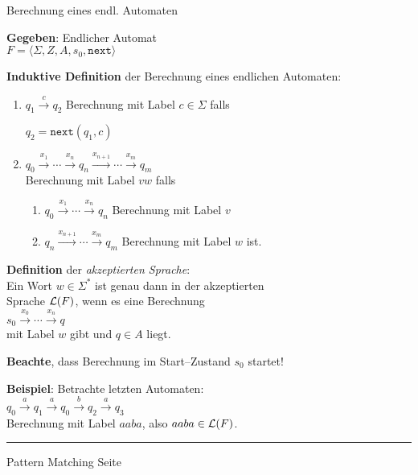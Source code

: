 \begin{slide}{}
\normalsize

\begin{center}
  Berechnung eines endl. Automaten
\end{center}
\vspace*{0.5cm}

\footnotesize
\textbf{Gegeben}: Endlicher Automat \\[0.3cm]
\hspace*{1.3cm} $F = \langle \Sigma, Z, A, s_0, \mathtt{next}  \rangle$ 

\textbf{Induktive Definition} der Berechnung eines endlichen Automaten:
\begin{enumerate}
\item $q_1 \stackrel{c}{\rightarrow} q_2$ \quad Berechnung mit Label $c\in \Sigma$ falls 

      $q_2 = \mathtt{next}(q_1, c)$
\item $q_0 \stackrel{x_1}{\rightarrow} \cdots \stackrel{x_n}{\rightarrow} q_n \stackrel{x_{n+1}}{\rightarrow} \cdots \stackrel{x_m}{\rightarrow} q_{m}$ \\[0.3cm]
      Berechnung mit Label $vw$ falls 
      \begin{enumerate}
      \item $q_0 \stackrel{x_1}{\rightarrow} \cdots \stackrel{x_n}{\rightarrow} q_n$ Berechnung mit Label $v$
      \item $q_n \stackrel{x_{n+1}}{\rightarrow} \cdots \stackrel{x_m}{\rightarrow} q_{m}$  Berechnung mit Label $w$ ist.
      \end{enumerate}
\end{enumerate}

\textbf{Definition} der \emph{akzeptierten Sprache}: \\[0.3cm]
Ein Wort $w \in \Sigma^*$ ist genau dann in der akzeptierten \\
Sprache ${\cal L}(F)$, wenn es eine Berechnung \\[0.3cm]
\hspace*{1.3cm} $s_0 \stackrel{x_0}{\rightarrow} \cdots \stackrel{x_n}{\rightarrow} q$ \\[0.3cm]
mit Label $w$ gibt und $q \in A$ liegt. 

\textbf{Beachte}, dass Berechnung im Start--Zustand $s_0$ startet!

\textbf{Beispiel}: Betrachte letzten Automaten: \\[0.3cm]
\hspace*{1.3cm} $q_0 \stackrel{a}{\rightarrow} q_1 \stackrel{a}{\rightarrow} q_0 \stackrel{b}{\rightarrow} q_2 \stackrel{a}{\rightarrow} q_3$ \\[0.3cm]
Berechnung mit Label $aaba$, also $aaba \in {\cal L}(F)$.



\vspace*{\fill}
\tiny \addtocounter{mypage}{1}
\rule{17cm}{1mm}
Pattern Matching \hspace*{\fill} Seite 
\end{slide}

